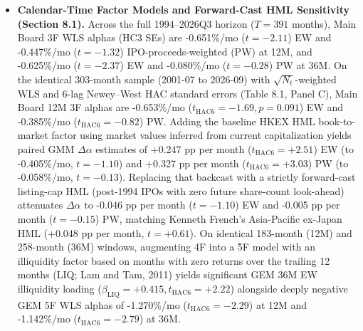 \documentclass[11pt,letterpaper]{article}
\begin{document}
\begin{itemize}
\item \textbf{Calendar-Time Factor Models and Forward-Cast HML Sensitivity (Section 8.1).} Across the full 1994–2026Q3 horizon ($T = 391$ months), Main Board 3F WLS alphas (HC3 SEs) are -0.651\%/mo ($t = -2.11$) EW and -0.447\%/mo ($t = -1.32$) IPO-proceeds-weighted (PW) at 12M, and -0.625\%/mo ($t = -2.37$) EW and -0.080\%/mo ($t = -0.28$) PW at 36M. On the identical 303-month sample (2001-07 to 2026-09) with $\sqrt{N_t}$-weighted WLS and 6-lag Newey–West HAC standard errors (Table 8.1, Panel C), Main Board 12M 3F alphas are -0.653\%/mo ($t_{\text{HAC6}} = -1.69, p = 0.091$) EW and -0.385\%/mo ($t_{\text{HAC6}} = -0.82$) PW. Adding the baseline HKEX HML book-to-market factor using market values inferred from current capitalization yields paired GMM $\Delta\alpha$ estimates of +0.247 pp per month ($t_{\text{HAC6}} = +2.51$) EW (to -0.405\%/mo, $t = -1.10$) and +0.327 pp per month ($t_{\text{HAC6}} = +3.03$) PW (to -0.058\%/mo, $t = -0.13$). Replacing that backcast with a strictly forward-cast listing-cap HML (post-1994 IPOs with zero future share-count look-ahead) attenuates $\Delta\alpha$ to -0.046 pp per month ($t = -1.10$) EW and -0.005 pp per month ($t = -0.15$) PW, matching Kenneth French's Asia-Pacific ex-Japan HML (+0.048 pp per month, $t = +0.61$). On identical 183-month (12M) and 258-month (36M) windows, augmenting 4F into a 5F model with an illiquidity factor based on months with zero returns over the trailing 12 months (LIQ; Lam and Tam, 2011) yields significant GEM 36M EW illiquidity loading ($\beta_{\text{LIQ}} = +0.415, t_{\text{HAC6}} = +2.22$) alongside deeply negative GEM 5F WLS alphas of -1.270\%/mo ($t_{\text{HAC6}} = -2.29$) at 12M and -1.142\%/mo ($t_{\text{HAC6}} = -2.79$) at 36M.

\end{itemize}
\end{document}

